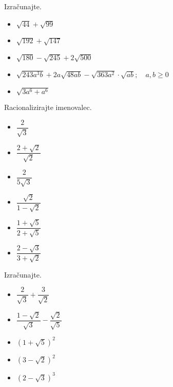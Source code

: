 \begin{multicols}{2}
        
            \begin{naloga}
                Izračunajte.
                \begin{itemize}
                        \item $\sqrt{44}+\sqrt{99}$ 
                        \item $\sqrt{192}+\sqrt{147}$ 
                        \item $\sqrt{180}-\sqrt{245}+2\sqrt{500}$ 
                        \item $\sqrt{243a^3b}+2a\sqrt{48ab}-\sqrt{363a^2}\cdot\sqrt{ab}; \quad a,b\geq 0$ 
                        \item $\sqrt{3a^6+a^6}$ 
                \end{itemize}
            \end{naloga}
        


        
            \begin{naloga}
                Racionalizirajte imenovalec.
                \begin{itemize}
                        \item $\dfrac{2}{\sqrt{3}}$ 
                        \item $\dfrac{2+\sqrt{2}}{\sqrt{2}}$ 
                        \item $\dfrac{2}{5\sqrt{3}}$ 
                        \item $\dfrac{\sqrt{2}}{1-\sqrt{2}}$ 
                        \item $\dfrac{1+\sqrt{5}}{2+\sqrt{5}}$ 
                        \item $\dfrac{2-\sqrt{3}}{3+\sqrt{2}}$ 
                \end{itemize}
            \end{naloga}
        


        
            \begin{naloga}
                Izračunajte.
                \begin{itemize}
                        \item $\dfrac{2}{\sqrt{3}}+\dfrac{3}{\sqrt{2}}$ 
                        \item $\dfrac{1-\sqrt{2}}{\sqrt{3}}-\dfrac{\sqrt{2}}{\sqrt{5}}$ 
                        \item $\left(1+\sqrt{5}\right)^2$ 
                        \item $\left(3-\sqrt{2}\right)^2$ 
                        \item $\left(2-\sqrt{3}\right)^3$ 
                \end{itemize}
            \end{naloga}
        



\end{multicols}
